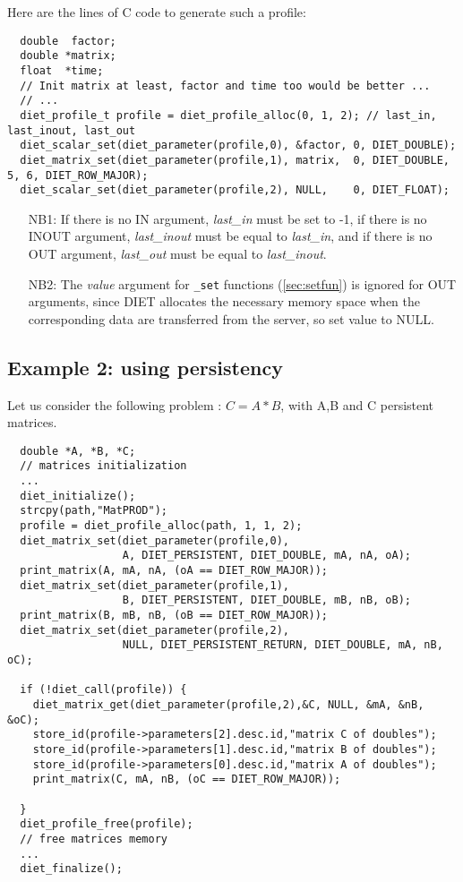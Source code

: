Here are the lines of C code to generate such a profile:
{\footnotesize
\begin{verbatim}
  double  factor;
  double *matrix;
  float  *time;
  // Init matrix at least, factor and time too would be better ...
  // ...
  diet_profile_t profile = diet_profile_alloc(0, 1, 2); // last_in, last_inout, last_out
  diet_scalar_set(diet_parameter(profile,0), &factor, 0, DIET_DOUBLE);
  diet_matrix_set(diet_parameter(profile,1), matrix,  0, DIET_DOUBLE, 5, 6, DIET_ROW_MAJOR);
  diet_scalar_set(diet_parameter(profile,2), NULL,    0, DIET_FLOAT);
\end{verbatim}
}

\begin{itemize}
\item[NB1:] If there is no IN argument, \emph{last\_in} must be set to
  -1, if there is no INOUT argument, \emph{last\_inout} must
  be equal to \emph{last\_in}, and if there is no OUT argument,
  \emph{last\_out} must be equal to \emph{last\_inout}.
\item[NB2:] The \emph{value} argument for \texttt{\_set} functions
  (\ref{sec:setfun}) is ignored for OUT arguments, since DIET
  allocates the necessary memory space when the corresponding data are
  transferred from the server, so set value to NULL.
\end{itemize}

\subsection{Example 2: using persistency}

Let us consider the following problem : $C=A*B$, with A,B and C
persistent matrices.


{\footnotesize
\begin{verbatim}
  double *A, *B, *C; 
  // matrices initialization
  ...
  diet_initialize();
  strcpy(path,"MatPROD");
  profile = diet_profile_alloc(path, 1, 1, 2);
  diet_matrix_set(diet_parameter(profile,0),
                  A, DIET_PERSISTENT, DIET_DOUBLE, mA, nA, oA);
  print_matrix(A, mA, nA, (oA == DIET_ROW_MAJOR));
  diet_matrix_set(diet_parameter(profile,1),
                  B, DIET_PERSISTENT, DIET_DOUBLE, mB, nB, oB);
  print_matrix(B, mB, nB, (oB == DIET_ROW_MAJOR));
  diet_matrix_set(diet_parameter(profile,2),
                  NULL, DIET_PERSISTENT_RETURN, DIET_DOUBLE, mA, nB, oC);
  
  if (!diet_call(profile)) {
    diet_matrix_get(diet_parameter(profile,2),&C, NULL, &mA, &nB, &oC);
    store_id(profile->parameters[2].desc.id,"matrix C of doubles");
    store_id(profile->parameters[1].desc.id,"matrix B of doubles");
    store_id(profile->parameters[0].desc.id,"matrix A of doubles");
    print_matrix(C, mA, nB, (oC == DIET_ROW_MAJOR));
      
  }
  diet_profile_free(profile);
  // free matrices memory
  ...
  diet_finalize();
\end{verbatim}
}

